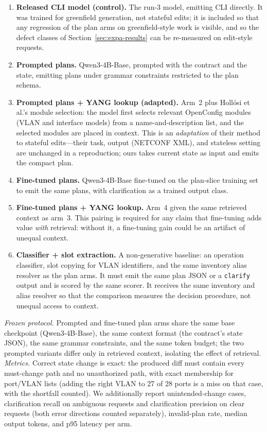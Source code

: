 \documentclass[conference]{IEEEtran}
\begin{document}
\begin{enumerate}
\item \textbf{Released CLI model (control).} The run-3 model, emitting CLI directly. It was trained for greenfield generation, not stateful edits; it is included so that any regression of the plan arms on greenfield-style work is visible, and so the defect classes of Section~\ref{sec:expa-results} can be re-measured on edit-style requests.
\item \textbf{Prompted plans.} Qwen3-4B-Base, prompted with the contract and the state, emitting plans under grammar constraints restricted to the plan schema.
\item \textbf{Prompted plans + YANG lookup (adapted).} Arm~2 plus Holl\'osi et al.'s module selection: the model first selects relevant OpenConfig modules (VLAN and interface models) from a name-and-description list, and the selected modules are placed in context. This is an \emph{adaptation} of their method to stateful edits---their task, output (NETCONF XML), and stateless setting are unchanged in a reproduction; ours takes current state as input and emits the compact plan.
\item \textbf{Fine-tuned plans.} Qwen3-4B-Base fine-tuned on the plan-slice training set to emit the same plans, with clarification as a trained output class.
\item \textbf{Fine-tuned plans + YANG lookup.} Arm~4 given the same retrieved context as arm~3. This pairing is required for any claim that fine-tuning adds value \emph{with} retrieval: without it, a fine-tuning gain could be an artifact of unequal context.
\item \textbf{Classifier + slot extraction.} A non-generative baseline: an operation classifier, slot copying for VLAN identifiers, and the same inventory alias resolver as the plan arms. It must emit the same plan JSON or a \texttt{clarify} output and is scored by the same scorer. It receives the same inventory and alias resolver so that the comparison measures the decision procedure, not unequal access to context.
\end{enumerate}

\emph{Frozen protocol.} Prompted and fine-tuned plan arms share the same base checkpoint (Qwen3-4B-Base), the same context format (the contract's state JSON), the same grammar constraints, and the same token budget; the two prompted variants differ only in retrieved context, isolating the effect of retrieval. \emph{Metrics.} Correct state change is exact: the produced diff must contain every must-change path and no unauthorized path, with exact membership for port/VLAN lists (adding the right VLAN to 27 of 28 ports is a miss on that case, with the shortfall counted). We additionally report unintended-change cases, clarification recall on ambiguous requests and clarification precision on clear requests (both error directions counted separately), invalid-plan rate, median output tokens, and p95 latency per arm.
\end{document}
